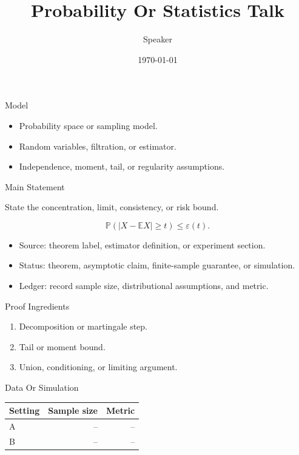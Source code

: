 \documentclass[10pt,aspectratio=169]{beamer}
\title{Probability Or Statistics Talk}
\author{Speaker}
\date{\today}
\begin{document}
\begin{frame}\titlepage\end{frame}

\begin{frame}{Model}
  \begin{itemize}
    \item Probability space or sampling model.
    \item Random variables, filtration, or estimator.
    \item Independence, moment, tail, or regularity assumptions.
  \end{itemize}
\end{frame}

\begin{frame}{Main Statement}
  \begin{theorem}
    State the concentration, limit, consistency, or risk bound.
  \end{theorem}
  \[
    \mathbb{P}\left(|X-\mathbb{E}X| \ge t\right) \le \varepsilon(t).
  \]
  \begin{itemize}
    \item Source: theorem label, estimator definition, or experiment section.
    \item Status: theorem, asymptotic claim, finite-sample guarantee, or simulation.
    \item Ledger: record sample size, distributional assumptions, and metric.
  \end{itemize}
\end{frame}

\begin{frame}{Proof Ingredients}
  \begin{enumerate}
    \item Decomposition or martingale step.
    \item Tail or moment bound.
    \item Union, conditioning, or limiting argument.
  \end{enumerate}
\end{frame}

\begin{frame}{Data Or Simulation}
  \begin{tabular}{lrr}
    \toprule
    Setting & Sample size & Metric \\
    \midrule
    A & -- & -- \\
    B & -- & -- \\
    \bottomrule
  \end{tabular}
\end{frame}
\end{document}
